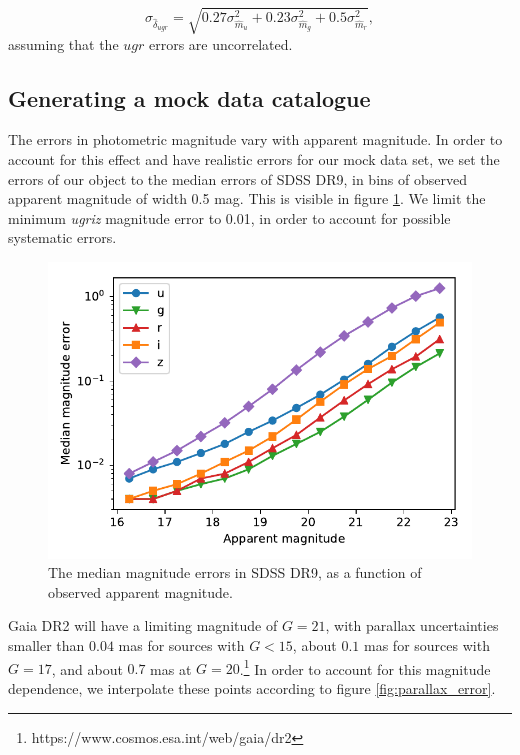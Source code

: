 \documentclass[fleqn,usenatbib]{mnras}
\begin{document}
\begin{equation}
	\sigma_{\hat{\delta}_{ugr}} = \sqrt{ 0.27 \sigma_{\hat{m}_u}^2 + 0.23 \sigma_{\hat{m}_g}^2 + 0.5 \sigma_{\hat{m}_r}^2 },
\end{equation}
assuming that the $ugr$ errors are uncorrelated.


\subsection{Generating a mock data catalogue}

The errors in photometric magnitude vary with apparent magnitude. In order to account for this effect and have realistic errors for our mock data set, we set the errors of our object to the median errors of SDSS DR9, in bins of observed apparent magnitude of width 0.5 mag. This is visible in figure \ref{fig:magnitude_error}. We limit the minimum \emph{ugriz} magnitude error to 0.01, in order to account for possible systematic errors.

\begin{figure}
	\includegraphics[width=\columnwidth]{median_app_errors.pdf}
    \caption{The median magnitude errors in SDSS DR9, as a function of observed apparent magnitude.}
    \label{fig:magnitude_error}
\end{figure}

Gaia DR2 will have a limiting magnitude of $G=21$, with parallax uncertainties smaller than $0.04$ mas for sources with $G<15$, about $0.1$ mas for sources with $G=17$, and about $0.7$ mas at $G=20$.\footnote{https://www.cosmos.esa.int/web/gaia/dr2} In order to account for this magnitude dependence, we interpolate these points according to figure \ref{fig:parallax_error}.
\end{document}
